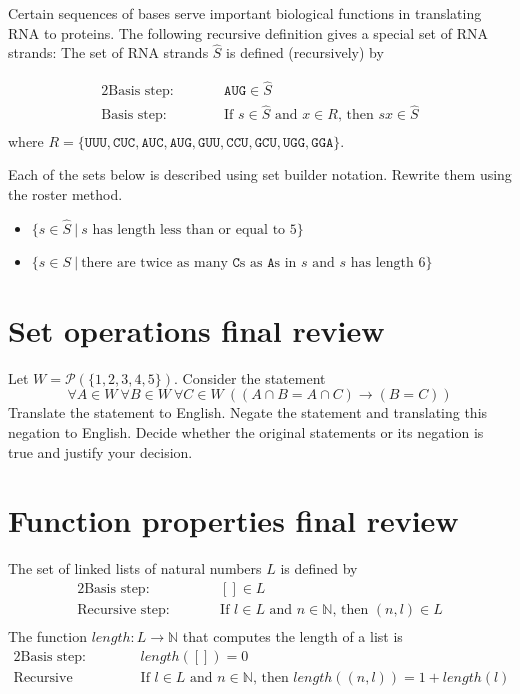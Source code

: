 \documentclass[12pt, oneside]{article}
\newcommand{\A}[0]{\texttt{A}}
\newcommand{\C}[0]{\texttt{C}}
\newcommand{\G}[0]{\texttt{G}}
\newcommand{\U}[0]{\texttt{U}}
\begin{document}
Certain 
 sequences of bases serve important biological functions in translating RNA to proteins. The following
 recursive definition gives a special set of RNA strands: The set of RNA strands $\hat{S}$ is defined (recursively)
 by 
 
 \begin{alignat*}{2}
\text{Basis step:} & & \A\U\G \in \hat{S}\\
\text{Basis step:} & \qquad& \text{If } s \in \hat{S} \text{ and } x \in R \text{, then } sx\in \hat{S}\\
 \end{alignat*}
 where $R = \{ \U\U\U, \C\U\C, \A\U\C, \A\U\G, \G\U\U, \C\C\U, \G\C\U, \U\G\G, \G\G\A \}$.

Each of the sets below is described using set builder notation. Rewrite them using the roster method. 
\begin{itemize}
\item $\{s \in \hat{S} ~|~ s \text{ has length less than or equal to $5$} \}$ 

\vspace{50pt}


\item $\{s \in S ~|~ \text{there are twice as many $\C$s as $\A$s in $s$ and $s$ has length $6$} \}$ 

\vspace{50pt}

\end{itemize} \vfill
\section*{Set operations final review}


Let $W = \mathcal{P}( \{ 1,2,3,4,5\})$. Consider the statement 
\[
\forall A \in W~ \forall B \in W ~ \forall C \in W~ ((A \cap B = A \cap C) \to (B=C) )
\]
Translate the statement to English.
Negate the statement 
and translating this negation to English.
Decide whether the original statements or its negation is true
and justify your decision.
 \vfill
\section*{Function properties final review}


The set of linked lists of natural numbers $L$ is defined by 
 \begin{alignat*}{2}
\text{Basis step:} & &[] \in L \\
\text{Recursive step:} & \qquad& \text{If } l \in L \text{ and } n \in \mathbb{N} \text{, then } (n,l) \in L\\
 \end{alignat*}
 The function $length: L \to \mathbb{N}$ that computes the length of a list is
  \begin{alignat*}{2}
\text{Basis step:} & &length([]) = 0\\
\text{Recursive step:} & \qquad& \text{If $l \in L$ and $n \in \mathbb{N}$, then } length( ( n,l) ) = 1 + length(l)\\
 \end{alignat*}
\end{document}
